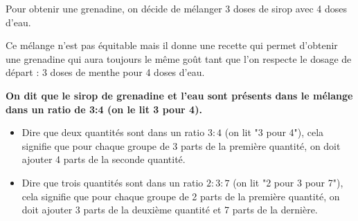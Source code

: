 \documentclass[a4paper]{book}
\begin{document}
    \begin{exemple}
        Pour obtenir une grenadine, on décide de mélanger 3 doses de sirop avec 4 doses d'eau.

        \medskip

        \begin{center}
        \end{center}

        \medskip

        Ce mélange n'est pas équitable mais il donne une recette qui permet d'obtenir une grenadine qui aura toujours le même goût tant que l'on respecte le dosage de départ : 3 doses de menthe pour 4 doses d'eau.

        \medskip

        \textbf{On dit que le sirop de grenadine et l'eau sont présents dans le mélange dans un ratio de 3:4 (on le lit 3 pour 4).}
    \end{exemple}


    \begin{definition}
        \begin{itemize}[leftmargin=*]
            \item Dire que deux quantités sont dans un ratio $3:4$ (on lit "3 pour 4"), cela signifie que pour chaque groupe de 3 parts de la première quantité, on doit ajouter 4 parts de la seconde quantité.

            \item Dire que trois quantités sont dans un ratio $2:3:7$ (on lit "2 pour 3 pour 7"), cela signifie que pour chaque groupe de 2 parts de la première quantité, on doit ajouter 3 parts de la deuxième quantité et 7 parts de la dernière.
        \end{itemize}
    \end{definition}
\end{document}
